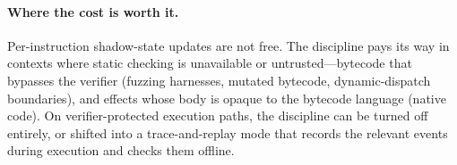 \paragraph{Where the cost is worth it.}
Per-instruction shadow-state updates are not free. The discipline
pays its way in contexts where static checking is unavailable or
untrusted---bytecode that bypasses the verifier (fuzzing harnesses,
mutated bytecode, dynamic-dispatch boundaries), and effects whose
body is opaque to the bytecode language (native code). On
verifier-protected execution paths, the discipline can be turned off
entirely, or shifted into a trace-and-replay mode that records the
relevant events during execution and checks them offline.
